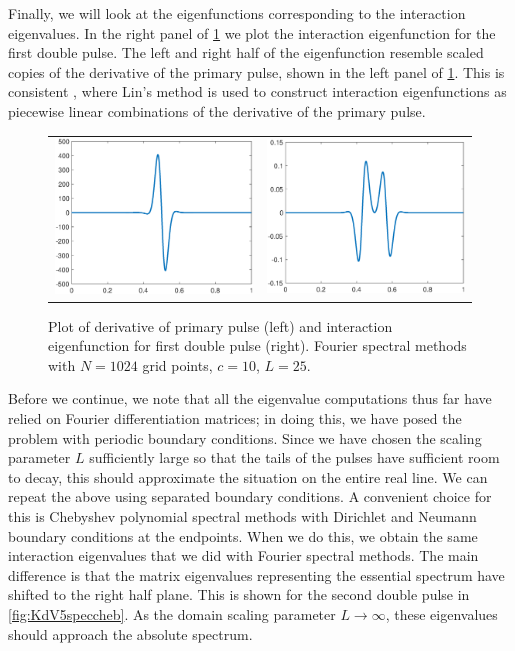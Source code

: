\documentclass[thesis.tex]{subfiles}
\begin{document}
Finally, we will look at the eigenfunctions corresponding to the interaction eigenvalues. In the right panel of \cref{fig:KdV5inteigplot} we plot the interaction eigenfunction for the first double pulse. The left and right half of the eigenfunction resemble scaled copies of the derivative of the primary pulse, shown in the left panel of \cref{fig:KdV5inteigplot}. This is consistent \cite{Sandstede1998}, where Lin's method is used to construct interaction eigenfunctions as piecewise linear combinations of the derivative of the primary pulse.

\begin{figure}[H]
\begin{center}
\begin{tabular}{cc}
\includegraphics[width=6cm]{images/kdv5numerics/single10derivative} &
\includegraphics[width=6cm]{images/kdv5numerics/double1inteigfunction} \\
\end{tabular}
\caption{Plot of derivative of primary pulse (left) and interaction eigenfunction for first double pulse (right). Fourier spectral methods with $N = 1024$ grid points, $c = 10$, $L = 25$.}
\label{fig:KdV5inteigplot}
\end{center}
\end{figure}

Before we continue, we note that all the eigenvalue computations thus far have relied on Fourier differentiation matrices; in doing this, we have posed the problem with periodic boundary conditions. Since we have chosen the scaling parameter $L$ sufficiently large so that the tails of the pulses have sufficient room to decay, this should approximate the situation on the entire real line. We can repeat the above using separated boundary conditions. A convenient choice for this is Chebyshev polynomial spectral methods with Dirichlet and Neumann boundary conditions at the endpoints. When we do this, we obtain the same interaction eigenvalues that we did with Fourier spectral methods. The main difference is that the matrix eigenvalues representing the essential spectrum have shifted to the right half plane. This is shown for the second double pulse in \cref{fig:KdV5speccheb}. As the domain scaling parameter $L \rightarrow \infty$, these eigenvalues should approach the absolute spectrum.
\end{document}
